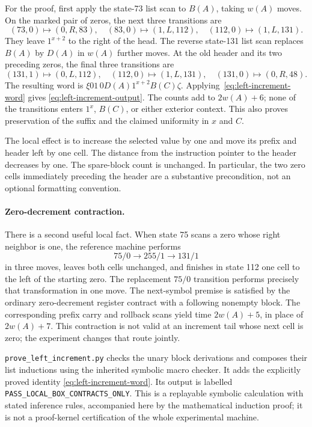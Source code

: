 For the proof, first apply the state-73 list scan to $B(A)$, taking
$w(A)$ moves.  On the marked pair of zeros, the next three transitions are
\[
 (73,0)\mapsto(0,R,83),\quad
 (83,0)\mapsto(1,L,112),\quad
 (112,0)\mapsto(1,L,131).
\]
They leave $1^{x+2}$ to the right of the head.  The reverse state-131
list scan replaces $B(A)$ by $D(A)$ in $w(A)$ further moves.  At the old
header and its two preceding zeros, the final three transitions are
\[
 (131,1)\mapsto(0,L,112),\quad
 (112,0)\mapsto(1,L,131),\quad
 (131,0)\mapsto(0,R,48).
\]
The resulting word is
$\xi01\,0D(A)1^{x+2}B(C)\zeta$.
Applying~\eqref{eq:left-increment-word} gives
\eqref{eq:left-increment-output}.  The counts add to $2w(A)+6$;
none of the transitions enters $1^x$, $B(C)$, or either exterior context.
This also proves preservation of the suffix and the claimed uniformity
in $x$ and $C$.

The local effect is to increase the selected value by one and move its
prefix and header left by one cell.  The distance from the instruction
pointer to the header decreases by one.  The spare-block count is
unchanged.  In particular, the two zero cells immediately preceding the
header are a substantive precondition, not an optional formatting
convention.

\paragraph{Zero-decrement contraction.}
There is a second useful local fact.  When state 75 scans a zero whose
right neighbor is one, the reference machine performs
\[
 75/0\to255/1\to131/1
\]
in three moves, leaves both cells unchanged, and finishes in state 112
one cell to the left of the starting zero.  The replacement $75/0$
transition performs precisely that transformation in one move.  The
next-symbol premise is satisfied by the ordinary zero-decrement
register contract with a following nonempty block.  The corresponding
prefix carry and rollback scans yield time $2w(A)+5$, in place of
$2w(A)+7$.  This contraction is not valid at an increment tail whose
next cell is zero; the experiment changes that route jointly.

\texttt{prove\_left\_increment.py} checks the unary block derivations
and composes their list inductions using the inherited symbolic macro
checker.  It adds the explicitly proved identity
\eqref{eq:left-increment-word}.  Its output is labelled
\texttt{PASS\_LOCAL\_BOX\_CONTRACTS\_ONLY}.  This is a replayable
symbolic calculation with stated inference rules, accompanied here by
the mathematical induction proof; it is not a proof-kernel certification
of the whole experimental machine.

